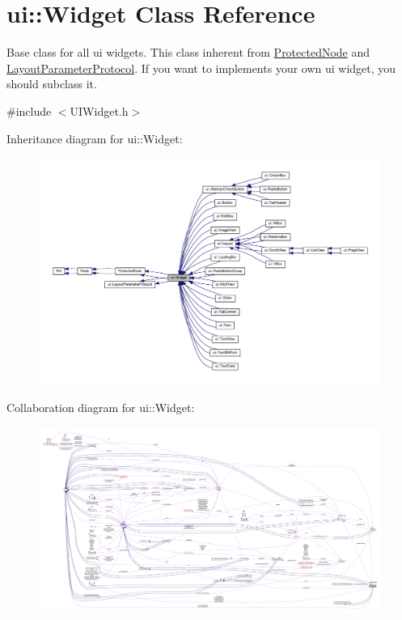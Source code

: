 \hypertarget{classui_1_1Widget}{}\section{ui\+:\+:Widget Class Reference}
\label{classui_1_1Widget}


Base class for all ui widgets. This class inherent from {\ttfamily \hyperlink{classProtectedNode}{Protected\+Node}} and {\ttfamily \hyperlink{classui_1_1LayoutParameterProtocol}{Layout\+Parameter\+Protocol}}. If you want to implements your own ui widget, you should subclass it.  




{\ttfamily \#include $<$U\+I\+Widget.\+h$>$}



Inheritance diagram for ui\+:\+:Widget\+:
\nopagebreak
\begin{figure}[H]
\begin{center}
\leavevmode
\includegraphics[width=350pt]{classui_1_1Widget__inherit__graph}
\end{center}
\end{figure}


Collaboration diagram for ui\+:\+:Widget\+:
\nopagebreak
\begin{figure}[H]
\begin{center}
\leavevmode
\includegraphics[width=350pt]{classui_1_1Widget__coll__graph}
\end{center}
\end{figure}
